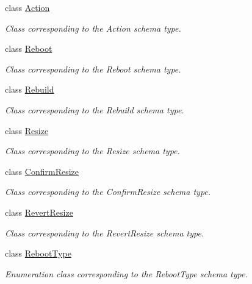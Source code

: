 \begin{DoxyCompactItemize}
class \hyperlink{classopenstack_1_1xml_1_1Action}{Action}
\begin{DoxyCompactList}\small\item\em Class corresponding to the Action schema type. \item\end{DoxyCompactList}\item 
class \hyperlink{classopenstack_1_1xml_1_1Reboot}{Reboot}
\begin{DoxyCompactList}\small\item\em Class corresponding to the Reboot schema type. \item\end{DoxyCompactList}\item 
class \hyperlink{classopenstack_1_1xml_1_1Rebuild}{Rebuild}
\begin{DoxyCompactList}\small\item\em Class corresponding to the Rebuild schema type. \item\end{DoxyCompactList}\item 
class \hyperlink{classopenstack_1_1xml_1_1Resize}{Resize}
\begin{DoxyCompactList}\small\item\em Class corresponding to the Resize schema type. \item\end{DoxyCompactList}\item 
class \hyperlink{classopenstack_1_1xml_1_1ConfirmResize}{ConfirmResize}
\begin{DoxyCompactList}\small\item\em Class corresponding to the ConfirmResize schema type. \item\end{DoxyCompactList}\item 
class \hyperlink{classopenstack_1_1xml_1_1RevertResize}{RevertResize}
\begin{DoxyCompactList}\small\item\em Class corresponding to the RevertResize schema type. \item\end{DoxyCompactList}\item 
class \hyperlink{classopenstack_1_1xml_1_1RebootType}{RebootType}
\begin{DoxyCompactList}\small\item\em Enumeration class corresponding to the RebootType schema type. \item\end{DoxyCompactList}\item 

\end{DoxyCompactItemize}
